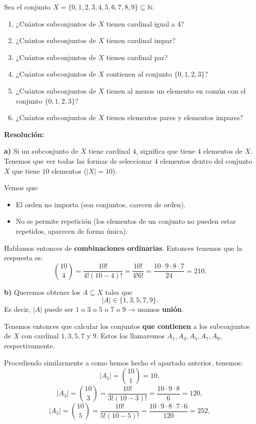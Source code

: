 \documentclass[a4paper,12pt]{article}
\begin{document}
\begin{ejercicio}[title=Ejercicio 15]
Sea el conjunto $X = \{0,1,2,3,4,5,6,7,8,9\} \subseteq \mathbb{N}$.

\begin{enumerate}
\item[a)] ¿Cuántos subconjuntos de $X$ tienen cardinal igual a 4?
\item[b)] ¿Cuántos subconjuntos de $X$ tienen cardinal impar?
\item[c)] ¿Cuántos subconjuntos de $X$ tienen cardinal par?
\item[d)] ¿Cuántos subconjuntos de $X$ contienen al conjunto $\{0,1,2,3\}$?
\item[e)] ¿Cuántos subconjuntos de $X$ tienen al menos un elemento en común con el conjunto $\{0,1,2,3\}$?
\item[f)] ¿Cuántos subconjuntos de $X$ tienen elementos pares y elementos impares?
\end{enumerate}

\tcblower
\textbf{Resolución:}

\textbf{a)}  
Si un subconjunto de $X$ tiene cardinal $4$, significa que tiene $4$ elementos de $X$.  
Tenemos que ver todas las formas de seleccionar $4$ elementos dentro del conjunto $X$ que tiene $10$ elementos ($|X| = 10$).

Vemos que:
\begin{itemize}
\item El orden no importa (son conjuntos, carecen de orden).
\item No se permite repetición (los elementos de un conjunto no pueden estar repetidos, aparecen de forma única).
\end{itemize}

Hablamos entonces de \textbf{combinaciones ordinarias}.  
Entonces tenemos que la respuesta es:
\[
\binom{10}{4}
= \frac{10!}{4!(10-4)!}
= \frac{10!}{4!6!}
= \frac{10\cdot 9\cdot 8\cdot 7}{24}
= \boxed{210}.
\]

\vspace{1em}

\textbf{b)}  
Queremos obtener los $A \subseteq X$ tales que  
\[
|A| \in \{1,3,5,7,9\}.
\]
Es decir, $|A|$ puede ser $1$ o $3$ o $5$ o $7$ o $9$ → usamos \textbf{unión}.

\vspace{0.5em}

Tenemos entonces que calcular los conjuntos \textbf{que contienen} a los subconjuntos de $X$ con cardinal $1,3,5,7$ y $9$. Estos los llamaremos $A_1, A_3, A_5, A_7, A_9$, respectivamente.

Procediendo similarmente a como hemos hecho el apartado anterior, tenemos:
\[
|A_1| = \binom{10}{1} = 10,
\]
\[
|A_3| = \binom{10}{3}
= \frac{10!}{3!(10-3)!}
= \frac{10\cdot 9\cdot 8}{6}
= 120,
\]
\[
|A_5| = \binom{10}{5}
= \frac{10!}{5!(10-5)!}
= \frac{10\cdot 9\cdot 8\cdot 7\cdot 6}{120}
= 252,
\]
\end{ejercicio}
\end{document}
